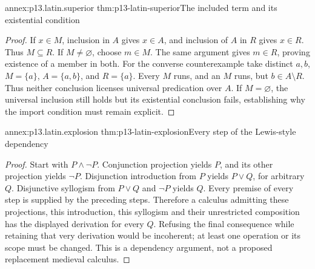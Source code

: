 \begin{annexitem}{annex:p13.latin.superior}
 {thm:p13-latin-superior}{The included term and its existential condition}
\begin{proof}
If \(x\in M\), inclusion in \(A\) gives \(x\in A\), and inclusion of
\(A\) in \(R\) gives \(x\in R\). Thus \(M\subseteq R\).
If \(M\ne\varnothing\), choose \(m\in M\). The same argument gives
\(m\in R\), proving existence of a member in both.
For the converse counterexample take distinct \(a,b\),
\(M=\{a\}\), \(A=\{a,b\}\), and \(R=\{a\}\).
Every \(M\) runs, and an \(M\) runs, but \(b\in A\setminus R\).
Thus neither conclusion licenses universal predication over \(A\).
If \(M=\varnothing\), the universal inclusion still holds but its
existential conclusion fails, establishing why the import condition
must remain explicit.
\end{proof}
\end{annexitem}

\begin{annexitem}{annex:p13.latin.explosion}
 {thm:p13-latin-explosion}{Every step of the Lewis-style dependency}
\begin{proof}
Start with \(P\land\neg P\). Conjunction projection yields \(P\),
and its other projection yields \(\neg P\).
Disjunction introduction from \(P\) yields \(P\lor Q\), for arbitrary \(Q\).
Disjunctive syllogism from \(P\lor Q\) and \(\neg P\) yields \(Q\).
Every premise of every step is supplied by the preceding steps.
Therefore a calculus admitting these projections, this introduction,
this syllogism and their unrestricted composition has the displayed
derivation for every \(Q\).
Refusing the final consequence while retaining that very derivation
would be incoherent; at least one operation or its scope must be changed.
This is a dependency argument, not a proposed replacement medieval calculus.
\end{proof}
\end{annexitem}

